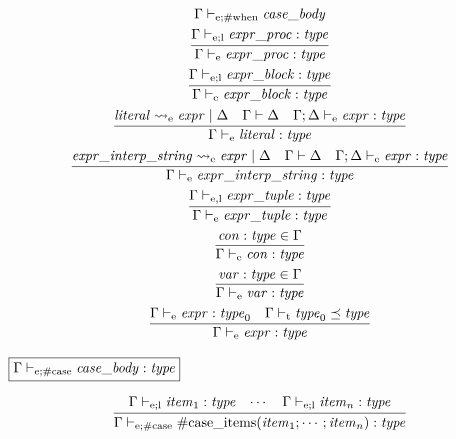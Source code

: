 \begin{gather*}
{        \Gamma \vdash_{\mathrm{e}; \mathrm{\#when}} \mathit{case\_body}
    }
    \\
    \infer{\Gamma \vdash_\mathrm{e} \mathit{expr\_proc}: \mathit{type}}{
        \Gamma \vdash_{\mathrm{e}; \mathrm{l}} \mathit{expr\_proc}: \mathit{type}
    }
    \\
    \infer{\Gamma \vdash_\mathrm{e} \mathit{expr\_block}: \mathit{type}}{
        \Gamma \vdash_{\mathrm{e}; \mathrm{l}} \mathit{expr\_block}: \mathit{type}
    }
    \\
    \infer{\Gamma \vdash_\mathrm{e} \mathit{literal}: \mathit{type}}{
        \mathit{literal} \rightsquigarrow_\mathrm{e} \mathit{expr} \mid \Delta
        &
        \Gamma \vdash \Delta
        &
        \Gamma; \Delta \vdash_\mathrm{e} \mathit{expr}: \mathit{type}
    }
    \\
    \infer{\Gamma \vdash_\mathrm{e} \mathit{expr\_interp\_string}: \mathit{type}}{
        \mathit{expr\_interp\_string} \rightsquigarrow_\mathrm{e} \mathit{expr} \mid \Delta
        &
        \Gamma \vdash \Delta
        &
        \Gamma; \Delta \vdash_\mathrm{e} \mathit{expr}: \mathit{type}
    }
    \\
    \infer{\Gamma \vdash_\mathrm{e} \mathit{expr\_tuple}: \mathit{type}}{
        \Gamma \vdash_{\mathrm{e}, \mathrm{l}} \mathit{expr\_tuple}: \mathit{type}
    }
    \\
    \infer{\Gamma \vdash_\mathrm{e} \mathit{con}: \mathit{type}}{
        \mathit{con}: \mathit{type} \in \Gamma
    }
    \\
    \infer{\Gamma \vdash_\mathrm{e} \mathit{var}: \mathit{type}}{
        \mathit{var}: \mathit{type} \in \Gamma
    }
    \\
    \infer{\Gamma \vdash_\mathrm{e} \mathit{expr}: \mathit{type}}{
        \Gamma \vdash_\mathrm{e} \mathit{expr}: \mathit{type}_0
        &
        \Gamma \vdash_\mathrm{t} \mathit{type}_0 \preceq \mathit{type}
    }
\end{gather*}

$\fbox{$\Gamma \vdash_{\mathrm{e}; \mathrm{\#case}} \mathit{case\_body}: \mathit{type}$}$

\begin{gather*}
    \infer{\Gamma \vdash_{\mathrm{e}; \mathrm{\#case}} \mathrm{\#case\_items}(\mathit{item}_1; \cdots; \mathit{item}_n): \mathit{type}}{
        \Gamma \vdash_{\mathrm{e}; \mathrm{l}} \mathit{item}_1: \mathit{type}
        &
        \cdots
        &
        \Gamma \vdash_{\mathrm{e}; \mathrm{l}} \mathit{item}_n: \mathit{type}
    }
\end{gather*}

